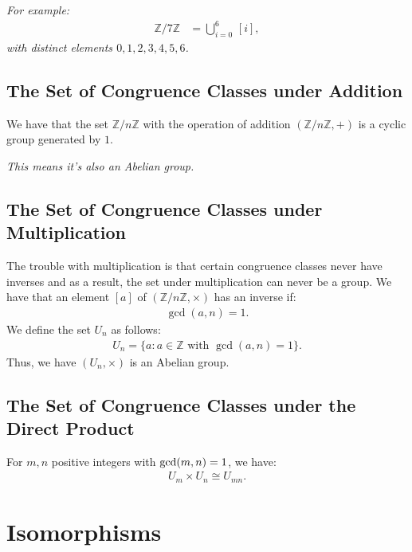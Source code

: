 \documentclass[a4paper, 12pt, twoside]{article}
\begin{document}
\textit{For example:}
\begin{align*}
      \mathbb{Z}/7\mathbb{Z} & = \bigcup_{i = 0}^{6} \, [i],
\end{align*}
\textit{with distinct elements $0, 1, 2, 3, 4, 5, 6$.}

\newpage

\subsection{The Set of Congruence Classes under Addition}

We have that the set $\mathbb{Z}/n\mathbb{Z}$ with the operation
of addition $(\mathbb{Z}/n\mathbb{Z}, +)$ is a cyclic group
generated by $1$.

\vspace{\baselineskip}

\textit{This means it's also an Abelian group.}

\subsection{The Set of Congruence Classes under Multiplication}

The trouble with multiplication is that certain congruence classes
never have inverses and as a result, the set under multiplication
can never be a group. We have that an element $[a]$ of
$(\mathbb{Z}/n\mathbb{Z}, \times)$ has an inverse if:
\begin{align*}
      \gcd{(a, n)} = 1.
\end{align*}
We define the set $U_n$ as follows:
\begin{align*}
      U_n = \{a : a \in \mathbb{Z} \text{ with } \gcd{(a, n) = 1}\}.
\end{align*}
Thus, we have $(U_n, \times)$ is an Abelian group.

\subsection{The Set of Congruence Classes under the Direct Product}

For $m, n$ positive integers with $\operatorname{gcd}(m, n) = 1$, we have:
\begin{align*}
      U_m \times U_n \cong U_{mn}.
\end{align*}

\section{Isomorphisms}
\end{document}
